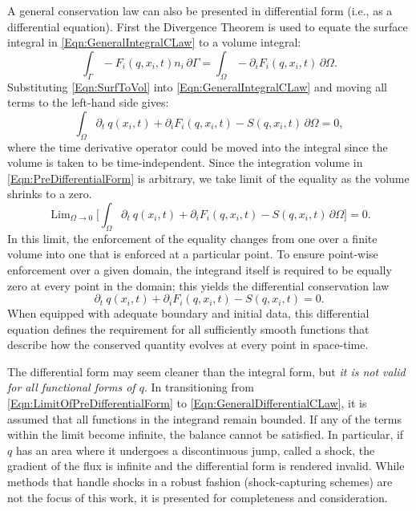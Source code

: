 \documentclass[Prelim,12pt]{WisconsinThesis}
\newcommand{\pdt}   {\partial_t\:\!}
\newcommand{\pdi}   {\partial_i}
\newcommand{\V}     {\ensuremath{\Omega}}
\newcommand{\dV}    {\,\partial\V}
\newcommand{\IntV}  {\int_{\V}}
\renewcommand{\S}   {\ensuremath{\Gamma}}
\newcommand{\dS}    {\,\partial\S}
\newcommand{\IntS}  {\int_{\S}}
\newcommand{\q}     {\ensuremath{q}}
\DeclareMathOperator*{\Lim}{Lim}
\begin{document}
A general conservation law can also be presented in differential form (i.e., as a differential equation).
First the Divergence Theorem is used to equate the surface integral in \cref{Eqn:GeneralIntegralCLaw} to a volume integral:
\begin{equation}
    \IntS -F_i(\q,x_i,t) n_i\dS = \IntV - \pdi F_i(\q,x_i,t) \dV.
    \label{Eqn:SurfToVol}
\end{equation}
Substituting \cref{Eqn:SurfToVol} into \cref{Eqn:GeneralIntegralCLaw} and moving all terms to the left-hand side gives:
\begin{equation}%
    \IntV \pdt\q(x_i,t) + \pdi F_i(\q,x_i,t) - S(\q,x_i,t) \dV = 0,
    \label{Eqn:PreDifferentialForm}
\end{equation}
where the time derivative operator could be moved into the integral since the volume is taken to be time-independent.
Since the integration volume in \cref{Eqn:PreDifferentialForm} is arbitrary, we take limit of the equality as the volume shrinks to a zero.
\begin{equation}%
    \Lim_{\V \rightarrow 0}\Biggl[\IntV \pdt\q(x_i,t) + \pdi F_i(\q,x_i,t) - S(\q,x_i,t) \dV \Biggr]= 0.
    \label{Eqn:LimitOfPreDifferentialForm}
\end{equation}
In this limit, the enforcement of the equality changes from one over a finite volume into one that is enforced at a particular point.
To ensure point-wise enforcement over a given domain, the integrand itself is required to be equally zero at every point in the domain; this yields the differential conservation law
\begin{equation}
    \pdt\q(x_i,t) + \pdi F_i(\q,x_i,t) - S(\q,x_i,t) = 0.
    \label{Eqn:GeneralDifferentialCLaw}
\end{equation}
When equipped with adequate boundary and initial data, this differential equation defines the requirement for all sufficiently smooth functions that describe how the conserved quantity evolves at every point in space-time.

The differential form may seem cleaner than the integral form, but \emph{it is not valid for all functional forms of \q{}}.
In transitioning from \cref{Eqn:LimitOfPreDifferentialForm} to \cref{Eqn:GeneralDifferentialCLaw}, it is assumed that all functions in the integrand remain bounded.
If any of the terms within the limit become infinite, the balance cannot be satisfied.
In particular, if \q{} has an area where it undergoes a discontinuous jump, called a shock, the gradient of the flux is infinite and the differential form is rendered invalid.
While methods that handle shocks in a robust fashion (shock-capturing schemes) are not the focus of this work, it is presented for completeness and consideration.
\end{document}

